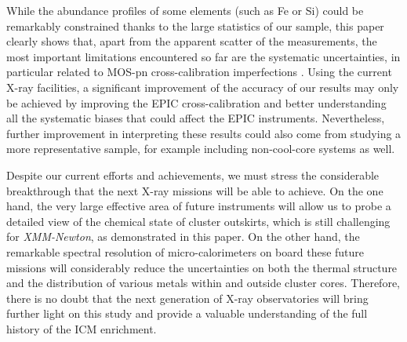 \documentclass{aa}
\begin{document}
While the abundance profiles of some elements (such as Fe or Si) could be remarkably constrained thanks to the large statistics of our sample, this paper clearly shows that, apart from the apparent scatter of the measurements, the most important limitations encountered so far are the systematic uncertainties, in particular related to MOS-pn cross-calibration imperfections \citep[see also][]{2015A&A...575A..30S,2016A&A...592A.157M}. Using the current X-ray facilities, a significant improvement of the accuracy of our results may only be achieved by improving the EPIC cross-calibration and better understanding all the systematic biases that could affect the EPIC instruments. Nevertheless, further improvement in interpreting these results could also come from studying a more representative sample, for example including non-cool-core systems as well.

Despite our current efforts and achievements, we must stress the considerable breakthrough that the next X-ray missions \citep[e.g. \textit{Athena};][]{2013arXiv1308.6784B} will be able to achieve. On the one hand, the very large effective area of future instruments will allow us to probe a detailed view of the chemical state of cluster outskirts, which is still challenging for \textit{XMM-Newton}, as demonstrated in this paper. On the other hand, the remarkable spectral resolution of micro-calorimeters on board these future missions will considerably reduce the uncertainties on both the thermal structure and the distribution of various metals within and outside cluster cores. Therefore, there is no doubt that the next generation of X-ray observatories will bring further light on this study and provide a valuable understanding of the full history of the ICM enrichment.
\end{document}
